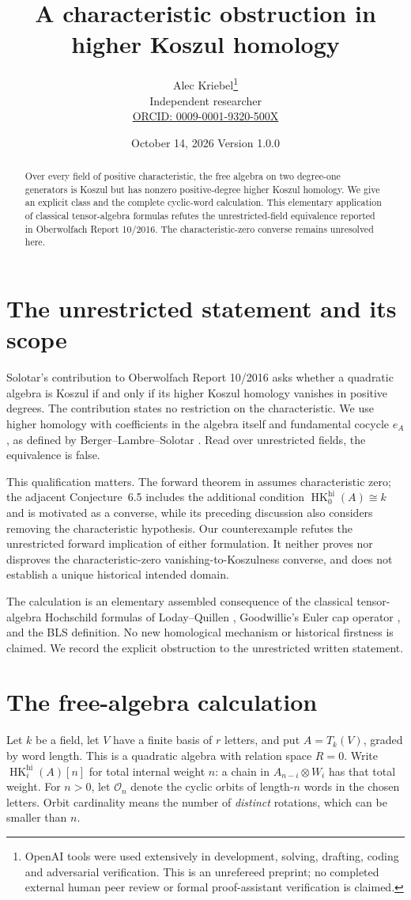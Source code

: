 \documentclass[10pt]{article}
\title{\vspace{-10mm}A characteristic obstruction in\\ higher Koszul homology}
\author{Alec Kriebel\thanks{OpenAI tools were used extensively in development,
 solving, drafting, coding and adversarial verification. This is an unrefereed
 preprint; no completed external human peer review or formal proof-assistant
 verification is claimed.}\\
 \small Independent researcher\\
 \small\href{https://orcid.org/0009-0001-9320-500X}{ORCID: 0009-0001-9320-500X}}
\date{October 14, 2026 \quad Version 1.0.0}
\newcommand{\HK}{\operatorname{HK}}
\begin{document}
\maketitle
\begin{abstract}
Over every field of positive characteristic, the free algebra on two
 degree-one generators is Koszul but has nonzero positive-degree higher
 Koszul homology. We give an explicit class and the complete cyclic-word
 calculation. This elementary application of classical tensor-algebra
 formulas refutes the unrestricted-field equivalence reported in
 Oberwolfach Report 10/2016. The characteristic-zero converse remains
 unresolved here.
\end{abstract}

\section{The unrestricted statement and its scope}
Solotar's contribution to Oberwolfach Report 10/2016
\cite[printed pp.~479--481]{OWR} asks whether a quadratic algebra is
Koszul if and only if its higher Koszul homology vanishes in positive
degrees. The contribution states no restriction on the characteristic.
We use higher homology with coefficients in the algebra itself and
fundamental cocycle \(e_A\), as defined by Berger--Lambre--Solotar
\cite[\S5.2]{BLS}. Read over unrestricted fields, the equivalence is false.

This qualification matters. The forward theorem in
\cite[Theorem~6.4]{BLS} assumes characteristic zero; the adjacent
Conjecture~6.5 includes the additional condition \(\HK^{\mathrm{hi}}_0(A)\cong k\)
and is motivated as a converse, while its preceding discussion also
considers removing the characteristic hypothesis.
Our counterexample refutes the unrestricted forward implication of
either formulation. It neither proves nor disproves the
characteristic-zero vanishing-to-Koszulness converse, and does not
establish a unique historical intended domain.

The calculation is an elementary assembled consequence of the classical
tensor-algebra Hochschild formulas of Loday--Quillen \cite[\S5]{LQ},
Goodwillie's Euler cap operator \cite[II.4.8]{G}, and the BLS definition.
No new homological mechanism or historical firstness is claimed.
We record the explicit obstruction to the unrestricted written statement.

\section{The free-algebra calculation}
Let \(k\) be a field, let \(V\) have a finite basis of \(r\) letters,
and put \(A=T_k(V)\), graded by word length. This is a quadratic
algebra with relation space \(R=0\).
Write \(\HK_i^{\mathrm{hi}}(A)[n]\) for total internal weight \(n\):
a chain in \(A_{n-i}\otimes W_i\) has that total weight.
For \(n>0\), let \(\mathcal O_n\) denote the cyclic orbits of length-\(n\)
words in the chosen letters. Orbit cardinality means the number of
\emph{distinct} rotations, which can be smaller than \(n\).
\end{document}
